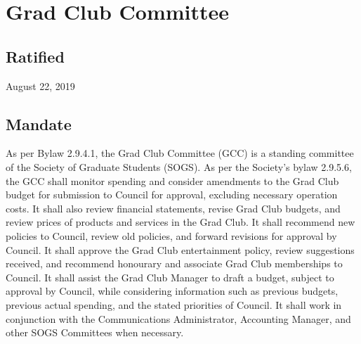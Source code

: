 \section{Grad Club Committee}

\subsection{Ratified}
August 22, 2019

\subsection{Mandate}
As per Bylaw 2.9.4.1, the Grad Club Committee (GCC) is a standing committee of the Society of Graduate Students (SOGS). As per the Society’s bylaw 2.9.5.6, the GCC shall monitor spending and consider amendments to the Grad Club budget for submission to Council for approval, excluding necessary operation costs. It shall also review financial statements, revise Grad Club budgets, and review prices of products and services in the Grad Club. It shall recommend new policies to Council, review old policies, and forward revisions for approval by Council. It shall approve the Grad Club entertainment policy, review suggestions received, and recommend honourary and associate Grad Club memberships to Council. It shall assist the Grad Club Manager to draft a budget, subject to approval by Council, while considering information such as previous budgets, previous actual spending, and the stated priorities of Council. It shall work in conjunction with the Communications Administrator, Accounting Manager, and other SOGS Committees when necessary.


